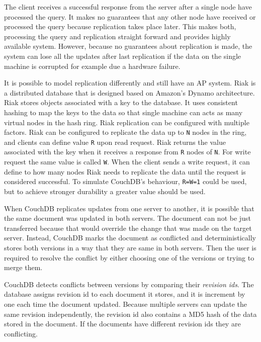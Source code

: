 The client receives a successful response from the server after a single node
have processed the query. It makes no guarantees that any other node have
received or processed the query because replication takes place later. This
makes both, processing the query and replication straight forward and provides
highly available system. However, because no guarantees about replication is
made, the system can lose all the updates after last replication if the data on
the single machine is corrupted for example due a hardware failure.

It is possible to model replication differently and still have an AP system.
Riak is a distributed database that is designed based on Amazon's Dynamo
architecture\cite{decandia2007dynamo}. Riak stores objects associated with a key
to the database. It uses consistent hashing\cite{karger1997consistent} to map
the keys to the data so that single machine can acts as many virtual nodes in
the hash ring. Riak replication can be configured with multiple factors. Riak
can be configured to replicate the data up to \texttt{N} nodes in the ring, and
clients can define value \texttt{R} upon read request. Riak returns the value
associated with the key when it receives a response from \texttt{R} nodes of
\texttt{N}. For write request the same value is called \texttt{W}. When the
client sends a write request, it can define to how many nodes Riak needs to
replicate the data until the request is considered successful. To simulate
CouchDB's behaviour, \texttt{R=W=1} could be used, but to achieve stronger
durability a greater value should be used.

When CouchDB replicates updates from one server to another, it is possible that
the same document was updated in both servers. The document can not be just
transferred because that would override the change that was made on the target
server. Instead, CouchDB marks the document as conflicted and deterministically
stores both versions in a way that they are same in both servers. Then the user
is required to resolve the conflict by either choosing one of the versions or
trying to merge them.

CouchDB detects conflicts between versions by comparing their \emph{revision
ids}. The database assigns revision id to each document it stores, and it is
increment by one each time the document updated. Because multiple servers can
update the same revision independently, the revision id also contains a MD5 hash
of the data stored in the document. If the documents have different revision ids
they are conflicting.

